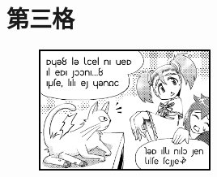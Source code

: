 \chapter{第三格}
\begin{figure}[H]
\includegraphics[width=0.5\textwidth]{ARKA/uni3.png}%
\end{figure}






























